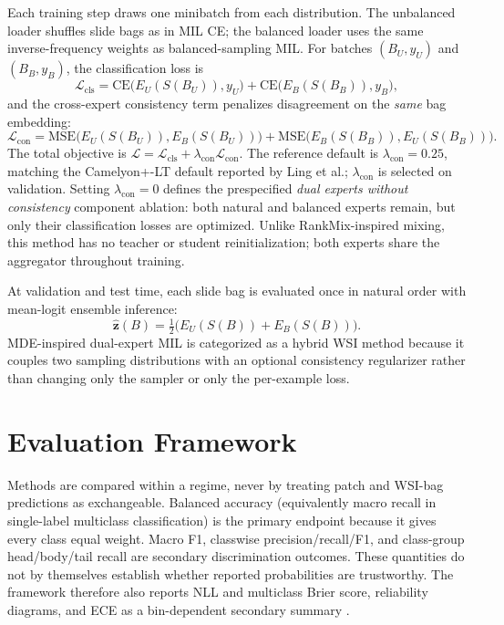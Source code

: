 \documentclass[11pt]{article}
\begin{document}
Each training step draws one minibatch from each distribution. The unbalanced loader shuffles slide bags as in MIL CE; the balanced loader uses the same inverse-frequency weights as balanced-sampling MIL. For batches $(B_U,y_U)$ and $(B_B,y_B)$, the classification loss is
\begin{equation}
  \mathcal{L}_{\mathrm{cls}} =
  \mathrm{CE}\bigl(E_U(S(B_U)), y_U\bigr) +
  \mathrm{CE}\bigl(E_B(S(B_B)), y_B\bigr),
  \label{eq:mde-cls}
\end{equation}
\noindent and the cross-expert consistency term penalizes disagreement on the \emph{same} bag embedding:
\begin{equation}
  \mathcal{L}_{\mathrm{con}} =
  \mathrm{MSE}\bigl(E_U(S(B_U)), E_B(S(B_U))\bigr) +
  \mathrm{MSE}\bigl(E_B(S(B_B)), E_U(S(B_B))\bigr).
  \label{eq:mde-con}
\end{equation}
\noindent The total objective is $\mathcal{L}=\mathcal{L}_{\mathrm{cls}}+\lambda_{\mathrm{con}}\mathcal{L}_{\mathrm{con}}$. The reference default is $\lambda_{\mathrm{con}}=\num{0.25}$, matching the Camelyon+-LT default reported by Ling et al.; $\lambda_{\mathrm{con}}$ is selected on validation. Setting $\lambda_{\mathrm{con}}=0$ defines the prespecified \emph{dual experts without consistency} component ablation: both natural and balanced experts remain, but only their classification losses are optimized. Unlike RankMix-inspired mixing, this method has no teacher or student reinitialization; both experts share the aggregator throughout training.

At validation and test time, each slide bag is evaluated once in natural order with mean-logit ensemble inference:
\begin{equation}
  \hat{\mathbf{z}}(B) = \tfrac{1}{2}\bigl(E_U(S(B)) + E_B(S(B))\bigr).
  \label{eq:mde-ensemble}
\end{equation}
\noindent MDE-inspired dual-expert MIL is categorized as a hybrid WSI method because it couples two sampling distributions with an optional consistency regularizer rather than changing only the sampler or only the per-example loss.

\section{Evaluation Framework}
\label{sec:evaluation}
Methods are compared within a regime, never by treating patch and WSI-bag predictions as exchangeable. Balanced accuracy (equivalently macro recall in single-label multiclass classification) is the primary endpoint because it gives every class equal weight. Macro F1, classwise precision/recall/F1, and class-group head/body/tail recall are secondary discrimination outcomes. These quantities do not by themselves establish whether reported probabilities are trustworthy. The framework therefore also reports NLL and multiclass Brier score, reliability diagrams, and ECE as a bin-dependent secondary summary \citep{mosquera2024classImbalance}.
\end{document}
